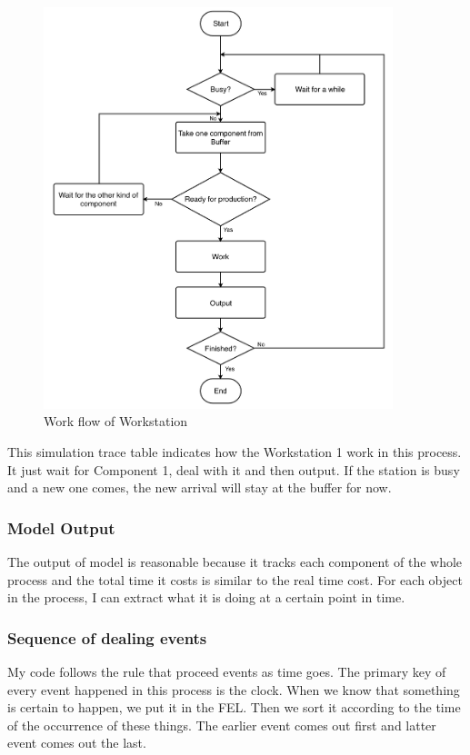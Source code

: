 \documentclass{article}
\begin{document}
\begin{figure}[htbp]
\begin{center}
\includegraphics[width=4in]{Flowchartws.png}
\caption{Work flow of Workstation}
\label{default}
\end{center}
\end{figure}


This simulation trace table indicates how the Workstation 1 work in this process. It just wait for Component 1, deal with it and then output. If the station is busy and a new one comes, the new arrival will stay at the buffer for now.

\subsubsection{Model Output}

The output of model is reasonable because it tracks each component of the whole process and the total time it costs is similar to the real time cost. For each object in the process, I can extract what it is doing at a certain point in time.

\subsubsection{Sequence of dealing events}

My code follows the rule that proceed events as time goes. The primary key of every event happened in this process is the clock. When we know that something is certain to happen, we put it in the FEL. Then we sort it according to the time of the occurrence of these things. The earlier event comes out first and latter event comes out the last. 
\end{document}
